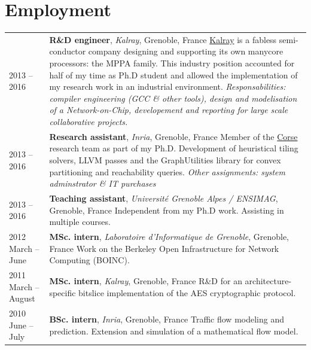 \documentclass[english,9pt]{extarticle}
\begin{document}
\section*{Employment}
\begin{tabular}{p{}p{}}
	2013 -- 2016 & \textbf{R\&D engineer}, \textit{Kalray}, Grenoble, France \newline
		\href{www.kalray.eu}{Kalray} is a fabless semi-conductor company designing and supporting its
		own manycore processors: the MPPA family. This industry position accounted for half of my time
		as Ph.D student and allowed the implementation of my research work in an industrial environment.
		\newline
		\textit{Responsabilities: compiler engineering (GCC \& other tools), design and modelisation of
		a Network-on-Chip, developement and reporting for large scale collaborative projects.}
		\vspace{0.2cm} \\
	2013 -- 2016 & \textbf{Research assistant}, \textit{Inria}, Grenoble, France \newline
		Member of the \href{https://team.inria.fr/corse}{Corse} research team as part of my Ph.D.
		Development of heuristical tiling solvers, LLVM passes and the GraphUtilities library for convex
		partitioning and reachability queries.
		\newline \textit{Other assignments: system adminstrator \& IT purchases}
		\vspace{0.2cm} \\
	2013 -- 2016 & \textbf{Teaching assistant}, \textit{Université Grenoble Alpes / ENSIMAG},
		Grenoble, France \newline 
		Independent from my Ph.D work. Assisting in multiple courses.
		\vspace{0.2cm} \\
	2012 \newline March -- June & \textbf{MSc. intern}, \textit{Laboratoire d'Informatique de
		Grenoble}, Grenoble, France \newline
		Work on the Berkeley Open Infrastructure for Network Computing (BOINC).
		\vspace{0.2cm} \\
	2011 \newline March -- August & \textbf{MSc. intern}, \textit{Kalray}, Grenoble, France \newline
		R\&D for an architecture-specific bitslice implementation of the AES cryptographic protocol.
		\vspace{0.2cm} \\
	2010 \newline June -- July & \textbf{BSc. intern}, \textit{Inria}, Grenoble, France \newline
		Traffic flow modeling and prediction. Extension and simulation of a mathematical flow model.
		\vspace{0.2cm} \\
\end{tabular}
\end{document}
